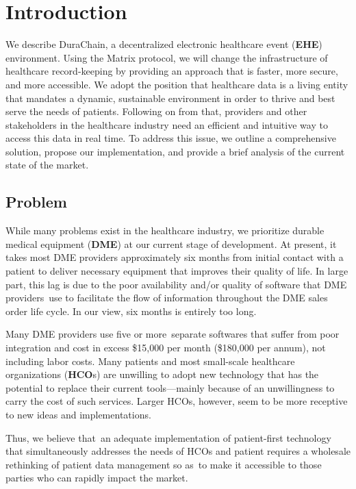 
\section{Introduction}
We describe DuraChain, a decentralized electronic healthcare event (\textbf{EHE}) environment. Using the Matrix protocol,\cite{matrixspec}
we will change the infrastructure of healthcare record-keeping by providing an approach that is faster, more secure, and more accessible. We adopt the position that healthcare data is a living entity that mandates a dynamic, sustainable environment in order to thrive and best serve the needs of patients. Following on from that, providers and other stakeholders in the healthcare industry need an efficient and intuitive way to access this data in real time. To address this issue, we outline a comprehensive solution, propose our implementation, and provide a brief analysis of the current state of the market.%

\subsection{Problem}
While many problems exist in the healthcare industry, we prioritize durable medical equipment (\textbf{DME}) at our current stage of development. At present, it takes most DME providers approximately six months from initial contact with a patient to deliver necessary equipment that improves their quality of life. In large part, this lag is due to the poor availability and/or quality of software that DME providers use to facilitate the flow of information throughout the DME sales order life cycle. In our view, six months is entirely too long.%

Many DME providers use five or more separate softwares that suffer from poor integration and cost in excess \$15,000 per month (\$180,000 per annum), not including labor costs. Many patients and most small-scale healthcare organizations (\textbf{HCO}s) are unwilling to adopt new technology that has the potential to replace their current tools---mainly because of an unwillingness to carry the cost of such services. Larger HCOs, however, seem to be more receptive to new ideas and implementations.﻿%

Thus, we believe that an adequate implementation of patient-first technology that simultaneously addresses the needs of HCOs and patient requires a wholesale rethinking of patient data management so as to make it accessible to those parties who can rapidly impact the market.%

